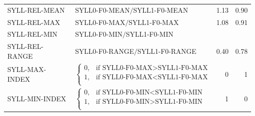 \begin{table}[htb]
{\begin{tabularx}{\textwidth}{p{}Xrr}
		SYLL-REL-MEAN & SYLL0-F0-MEAN$/$SYLL1-F0-MEAN 	& 1.13    & 0.90 \\
		SYLL-REL-MAX & SYLL0-F0-MAX$/$SYLL1-F0-MAX 			& 1.08		& 0.91 \\
		SYLL-REL-MIN & SYLL0-F0-MIN$/$SYLL1-F0-MIN &\color{red}{TD}&\color{red}{TD}\\
		
		SYLL-REL-RANGE & SYLL0-F0-RANGE$/$SYLL1-F0-RANGE & 0.40%
																															& 0.78\\
		SYLL-MAX-INDEX	
							& 	$\begin{cases} 
								0, & \text{if SYLL0-F0-MAX}>\text{SYLL1-F0-MAX}\\
								1, & \text{if SYLL0-F0-MAX}<\text{SYLL1-F0-MAX}\\
								\end{cases}$
																									& 0					& 1				\\
		SYLL-MIN-INDEX	
							& 	$\begin{cases} 
								0, & \text{if SYLL0-F0-MIN}<\text{SYLL1-F0-MIN}\\
								1, & \text{if SYLL0-F0-MIN}>\text{SYLL1-F0-MIN}\\
								\end{cases}$
																									& 1					& 0				\\
																									

\end{tabularx}}
\end{table}
